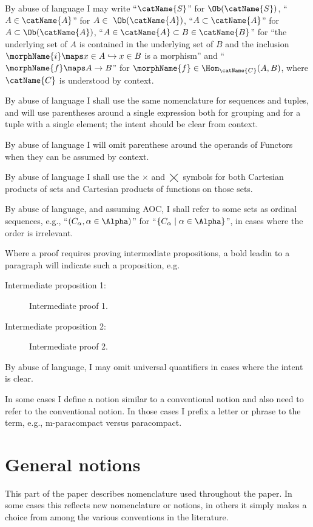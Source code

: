 \documentclass{article}
\begin{document}
By abuse of language I may write
``$\catName{S}$'' for $\Ob(\catName{S})$,
``$A \in \catName{A}$'' for  $A \in\ \Ob(\catName{A})$,
``$A \subset \catName{A}$'' for $A \subset \Ob(\catName{A})$,
``$A \in \catName{A} \subset B \in \catName{B}$'' for
``the underlying set of $A$ is contained in the underlying set of $B$
and the inclusion $\morphName{i} \maps x \in A \hookrightarrow x \in B$
is a morphism'' and
``$\morphName{f} \maps A \to B$'' for
$\morphName{f} \in \Hom_{\catName{C}}(A,B)$, where $\catName{C}$ is
understood by context.

By abuse of language I shall use the same nomenclature for sequences and
tuples, and will use parentheses around a single expression both for
grouping and for a tuple with a single element; the intent should be
clear from context.

By abuse of language I will omit parenthese around the operands of
Functors when they can be assumed by context.

By abuse of language I shall use the $\times$ and $\bigtimes$ symbols
for both Cartesian products of sets and Cartesian products of
functions on those sets.

By abuse of language, and assuming AOC,  I shall refer to some sets as
ordinal sequences, e.g., ``$(C_\alpha, \alpha \in \Alpha)$'' for
``$\{C_\alpha \mid \alpha \in \Alpha\}$'', in cases where the order is
irrelevant.

Where a proof requires proving intermediate propositions, a bold leadin
to a paragraph will indicate such a proposition, e.g.

\begin{description}
\item[Intermediate proposition 1:] Intermediate proof 1.

\item[Intermediate proposition 2:]
\leavevmode
Intermediate proof 2.
\end{description}

By abuse of language, I may omit universal quantifiers in cases where
the intent is clear.

In some cases I define a notion similar to a conventional notion and
also need to refer to the conventional notion. In those cases I prefix
a letter or phrase to the term, e.g., m-paracompact versus paracompact.

\part {General notions}
\label{part:notions}
This part of the paper describes nomenclature used throughout the paper.
In some cases this reflects new nomenclature or notions, in others it
simply makes a choice from among the various conventions in the
literature.
\end{document}
